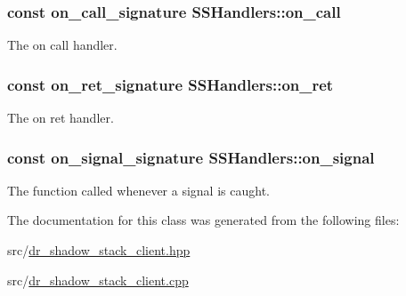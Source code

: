 \subsubsection[{\texorpdfstring{on\+\_\+call}{on_call}}]{\setlength{\rightskip}{0pt plus 5cm}const {\bf on\+\_\+call\+\_\+signature} S\+S\+Handlers\+::on\+\_\+call}\hypertarget{class_s_s_handlers_a2cd9221058871db09200f523f78bfb03}{}\label{class_s_s_handlers_a2cd9221058871db09200f523f78bfb03}


The \textquotesingle{}on call\textquotesingle{} handler. 

\subsubsection[{\texorpdfstring{on\+\_\+ret}{on_ret}}]{\setlength{\rightskip}{0pt plus 5cm}const {\bf on\+\_\+ret\+\_\+signature} S\+S\+Handlers\+::on\+\_\+ret}\hypertarget{class_s_s_handlers_a2044718e6183b14442c9bc9295b3dda2}{}\label{class_s_s_handlers_a2044718e6183b14442c9bc9295b3dda2}


The \textquotesingle{}on ret\textquotesingle{} handler. 

\subsubsection[{\texorpdfstring{on\+\_\+signal}{on_signal}}]{\setlength{\rightskip}{0pt plus 5cm}const {\bf on\+\_\+signal\+\_\+signature} S\+S\+Handlers\+::on\+\_\+signal}\hypertarget{class_s_s_handlers_a9933cca29ab671706a5df494e3fb3532}{}\label{class_s_s_handlers_a9933cca29ab671706a5df494e3fb3532}


The function called whenever a signal is caught. 



The documentation for this class was generated from the following files\+:\begin{DoxyCompactItemize}
\item 
src/\hyperlink{dr__shadow__stack__client_8hpp}{dr\+\_\+shadow\+\_\+stack\+\_\+client.\+hpp}\item 
src/\hyperlink{dr__shadow__stack__client_8cpp}{dr\+\_\+shadow\+\_\+stack\+\_\+client.\+cpp}\end{DoxyCompactItemize}

